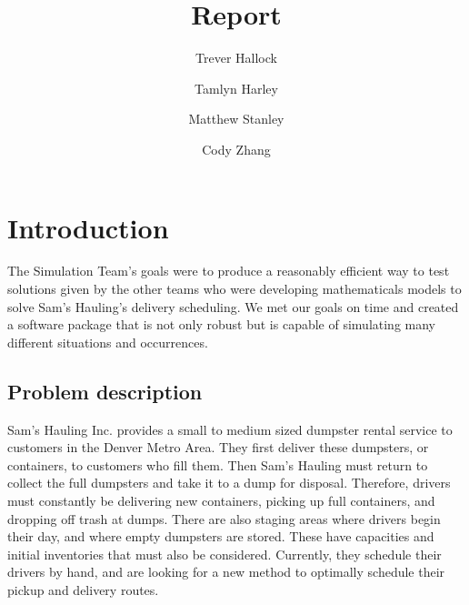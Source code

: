 \documentclass{article}
\title{Report}
\author{
	Trever Hallock \and
	Tamlyn Harley \and
	Matthew Stanley \and
	Cody Zhang
}
\makeatletter
\newcommand{\verbatimfont}[1]{\renewcommand{\verbatim@font}{\ttfamily#1}}
\makeatother
\begin{document}
\verbatimfont{\small}%

\maketitle


\clearpage
\tableofcontents
\clearpage


\section{Introduction}

The Simulation Team's goals were to produce a reasonably efficient way to test solutions given by the other teams who were developing mathematicals models to solve Sam's Hauling's delivery scheduling.
We met our goals on time and created a software package that is not only robust but is capable of simulating many different situations and occurrences.

\subsection{Problem description}

Sam’s Hauling Inc. provides a small to medium sized dumpster rental service to customers in the Denver Metro Area.
They first deliver these dumpsters, or containers, to customers who fill them. Then Sam’s Hauling must return to collect the full dumpsters and take it to a dump for disposal.
Therefore, drivers must constantly be delivering new containers, picking up full containers, and dropping off trash at dumps.
There are also staging areas where drivers begin their day, and where empty dumpsters are stored.
These have capacities and initial inventories that must also be considered.
Currently, they schedule their drivers by hand, and are looking for a new method to optimally schedule their pickup and delivery routes.
\end{document}
